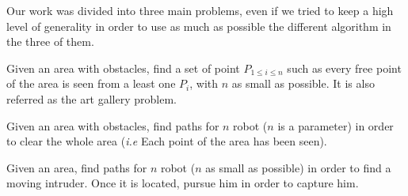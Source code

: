 Our work was divided into three main problems, even if we tried to keep a high level of generality in order to use as much as possible the different algorithm in the three of them.

\begin{problem}
Given an area with obstacles, find a set of point $P_{1\leq i \leq n}$ such as every free point of the area is seen from a least one $P_i$, with $n$ as small as possible. It is also referred as the art gallery problem.
\end{problem}
\begin{problem}
Given an area with obstacles, find paths for $n$ robot ($n$ is a parameter) in order to clear the whole area (\emph{i.e} Each point of the area has been seen).
\end{problem}
\begin{problem}
Given an area, find paths for $n$ robot ($n$ as small as possible) in order to find a moving intruder. Once it is located, pursue him in order to capture him.
\end{problem}